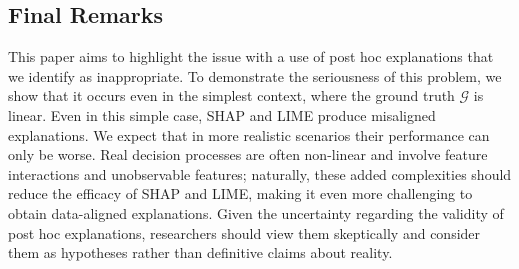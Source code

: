 \documentclass[mnsc,blindrev]{informs3}
\begin{document}
\subsection{Final Remarks}%
This paper aims to highlight the issue with a use of post hoc explanations that we identify as inappropriate. To demonstrate the seriousness of this problem, we show that it occurs even in the simplest context, where the ground truth $\mathcal{G}$ is linear. Even in this simple case, SHAP and LIME produce misaligned explanations. We expect that in more realistic scenarios their performance can only be worse. Real decision processes are often non-linear and involve feature interactions and unobservable features; naturally, these added complexities should reduce the efficacy of SHAP and LIME, making it even more challenging to obtain data-aligned explanations. Given the uncertainty regarding the validity of post hoc explanations, researchers should view them skeptically and consider them as hypotheses rather than definitive claims about reality. 


 


        

\end{document}
